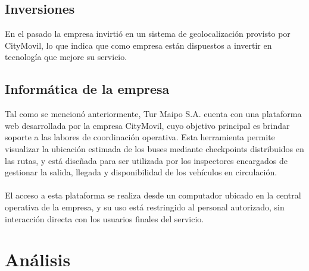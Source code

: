 \documentclass[12pt]{article}
\begin{document}
\subsection{Inversiones}

En el pasado la empresa invirtió en un sistema de geolocalización provisto por CityMovil, lo que indica que como empresa están dispuestos a invertir en tecnología que mejore su servicio.

\subsection{Informática de la empresa}

Tal como se mencionó anteriormente, Tur Maipo S.A. cuenta con una plataforma web desarrollada por la empresa CityMovil, cuyo objetivo principal es brindar soporte a las labores de coordinación operativa. Esta herramienta permite visualizar la ubicación estimada de los buses mediante checkpoints distribuidos en las rutas, y está diseñada para ser utilizada por los inspectores encargados de gestionar la salida, llegada y disponibilidad de los vehículos en circulación.
\\\\
El acceso a esta plataforma se realiza desde un computador ubicado en la central operativa de la empresa, y su uso está restringido al personal autorizado, sin interacción directa con los usuarios finales del servicio.
\newpage
\section{Análisis}
\end{document}
